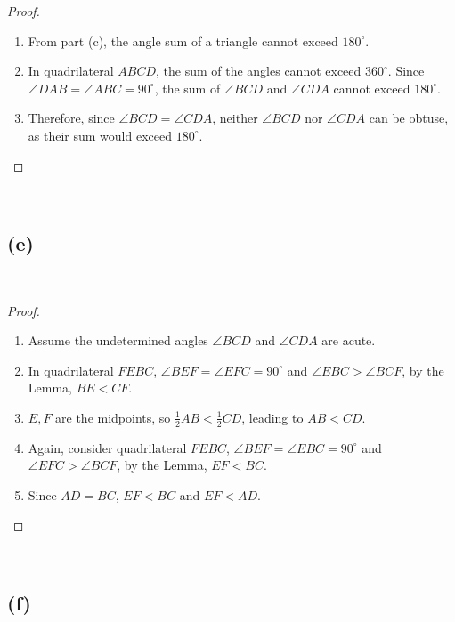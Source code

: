 \documentclass{article}
\begin{document}
\begin{proof}

~
\begin{enumerate}
    \item From part (c), the angle sum of a triangle cannot exceed \( 180^\circ \).

    \item In quadrilateral \( ABCD \), the sum of the angles cannot exceed \( 360^\circ \). Since \( \angle DAB = \angle ABC = 90^\circ \), the sum of \( \angle BCD \) and \( \angle CDA \) cannot exceed \( 180^\circ \).

    \item Therefore, since \( \angle BCD =\angle CDA \), neither \( \angle BCD \) nor \( \angle CDA \) can be obtuse, as their sum would exceed \( 180^\circ \).
\end{enumerate}
\end{proof}

~

\subsection*{(e)}

~

\begin{proof}
~
\begin{enumerate}
    \item Assume the undetermined angles \( \angle BCD \) and \( \angle CDA \) are acute.

    \item In quadrilateral \(FEBC\), \(\angle BEF=\angle EFC=90^\circ\) and \(\angle EBC>\angle BCF\), by the Lemma, \(BE<CF\).

    \item \(E,F\) are the midpoints, so \(\frac{1}{2}AB<\frac{1}{2}CD\), leading to \(AB<CD\).

    \item Again, consider quadrilateral \(FEBC\), \(\angle BEF=\angle EBC=90^\circ\) and \(\angle EFC>\angle BCF\), by the Lemma, \(EF<BC\).

    \item Since \(AD=BC\), \(EF<BC\) and \(EF<AD\).
\end{enumerate}
\end{proof}

~

\subsection*{(f)}
\end{document}
